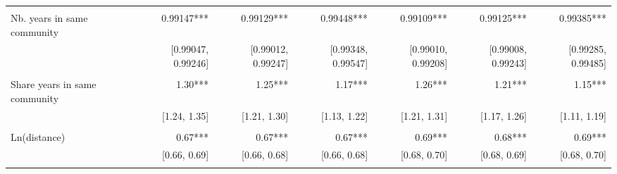 \begin{table}[!h]
\begin{tabular}{lllllll}
  \multicolumn{1}{|r}{} &
  \multicolumn{1}{r}{} &
  \multicolumn{1}{r}{} &
  \multicolumn{1}{r}{} &
  \multicolumn{1}{r}{} &
  \multicolumn{1}{r}{} \\
\multicolumn{1}{l}{Nb. years in same community} &
  \multicolumn{1}{|r}{0.99147***} &
  \multicolumn{1}{r}{0.99129***} &
  \multicolumn{1}{r}{0.99448***} &
  \multicolumn{1}{r}{0.99109***} &
  \multicolumn{1}{r}{0.99125***} &
  \multicolumn{1}{r}{0.99385***} \\
\multicolumn{1}{l}{} &
  \multicolumn{1}{|r}{[0.99047, 0.99246]} &
  \multicolumn{1}{r}{[0.99012, 0.99247]} &
  \multicolumn{1}{r}{[0.99348, 0.99547]} &
  \multicolumn{1}{r}{[0.99010, 0.99208]} &
  \multicolumn{1}{r}{[0.99008, 0.99243]} &
  \multicolumn{1}{r}{[0.99285, 0.99485]} \\
\multicolumn{1}{l}{} &
  \multicolumn{1}{|r}{} &
  \multicolumn{1}{r}{} &
  \multicolumn{1}{r}{} &
  \multicolumn{1}{r}{} &
  \multicolumn{1}{r}{} &
  \multicolumn{1}{r}{} \\
\multicolumn{1}{l}{Share years in same community} &
  \multicolumn{1}{|r}{1.30***} &
  \multicolumn{1}{r}{1.25***} &
  \multicolumn{1}{r}{1.17***} &
  \multicolumn{1}{r}{1.26***} &
  \multicolumn{1}{r}{1.21***} &
  \multicolumn{1}{r}{1.15***} \\
\multicolumn{1}{l}{} &
  \multicolumn{1}{|r}{[1.24,    1.35]} &
  \multicolumn{1}{r}{[1.21,    1.30]} &
  \multicolumn{1}{r}{[1.13,    1.22]} &
  \multicolumn{1}{r}{[1.21,    1.31]} &
  \multicolumn{1}{r}{[1.17,    1.26]} &
  \multicolumn{1}{r}{[1.11,    1.19]} \\
\multicolumn{1}{l}{} &
  \multicolumn{1}{|r}{} &
  \multicolumn{1}{r}{} &
  \multicolumn{1}{r}{} &
  \multicolumn{1}{r}{} &
  \multicolumn{1}{r}{} &
  \multicolumn{1}{r}{} \\
\multicolumn{1}{l}{Ln(distance)} &
  \multicolumn{1}{|r}{0.67***} &
  \multicolumn{1}{r}{0.67***} &
  \multicolumn{1}{r}{0.67***} &
  \multicolumn{1}{r}{0.69***} &
  \multicolumn{1}{r}{0.68***} &
  \multicolumn{1}{r}{0.69***} \\
\multicolumn{1}{l}{} &
  \multicolumn{1}{|r}{[0.66,    0.69]} &
  \multicolumn{1}{r}{[0.66,    0.68]} &
  \multicolumn{1}{r}{[0.66,    0.68]} &
  \multicolumn{1}{r}{[0.68,    0.70]} &
  \multicolumn{1}{r}{[0.68,    0.69]} &
  \multicolumn{1}{r}{[0.68,    0.70]} \\
\multicolumn{1}{l}{} &
  \multicolumn{1}{|r}{} &
  \multicolumn{1}{r}{} &
  \multicolumn{1}{r}{} &
  \multicolumn{1}{r}{} &
  \multicolumn{1}{r}{} &
  \multicolumn{1}{r}{} \\

\end{tabular}
\end{table}
